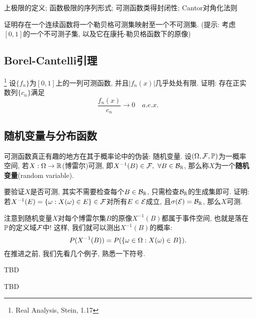 \begin{knowledge}
    上极限的定义; 函数极限的序列形式; 可测函数类得封闭性; Cantor对角化法则
\end{knowledge}

\begin{exercise} %
    证明存在一个连续函数将一个勒贝格可测集映射至一个不可测集. (提示: 考虑$[0,1]$的一个不可测子集, 以及它在康托-勒贝格函数下的原像)
\end{exercise}

\subsection{Borel-Cantelli引理}

\begin{exercise}\footnote{Real Analysis, Stein, 1.17}
    设$\{f_n\}$为$[0,1]$上的一列可测函数, 并且$|f_n(x)|$几乎处处有限. 证明: 存在正实数列$\{c_n\}$满足
    $$ \frac{f_n(x)}{c_n} \to 0 \quad a.e. x. $$
\end{exercise}

\subsection{随机变量与分布函数}
可测函数真正有趣的地方在其于概率论中的伪装: 随机变量. 
设$(\Omg, \calF, \P)$为一概率空间, 若$X:\Omg \to \R$(博雷尔)可测, 即$X^{-1}(B) \in \calF, ~\forall B \in \calB_\R$, 那么称$X$为一个\textbf{随机变量}(random variable). 
\begin{example}
    要验证$X$是否可测, 其实不需要检查每个$B \in \calB_\R$, 只需检查$\calB_\R$的生成集即可. 证明: 若$X^{-1}(E) = \{\omg:X(\omg) \in E\} \in \calF$对所有$E \in \calE$成立, 且$\sigma(\calE) = \calB_\R$, 那么$X$可测. 
\end{example}
注意到随机变量$X$对每个博雷尔集$B$的原像$X^{-1}(B)$都属于事件空间, 也就是落在$\P$的定义域$\calF$中! 这样, 我们就可以测出$X^{-1}(B)$的概率:
$$ P(X^{-1}(B)) = P(\{\omg \in \Omg: X(\omg) \in B\}). $$
在推进之前, 我们先看几个例子, 熟悉一下符号. 
\begin{example}
    TBD
\end{example}
\begin{example}
    TBD
\end{example}

